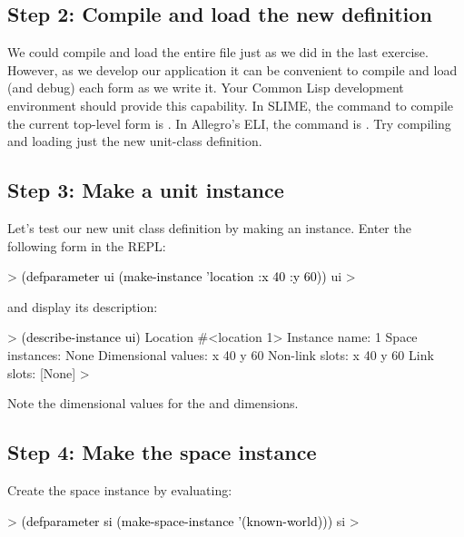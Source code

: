 \documentclass[10pt,twoside,english,pdftex]{article}
\begin{document}
\subsection*{Step 2: Compile and load the new definition}

We could compile and load the entire  file
just as we did in the last exercise.  However, as we develop our
application it can be convenient to compile and load (and debug) each
form as we write it.  Your Common Lisp development environment should
provide this capability.  In SLIME, the command to compile the current
top-level form is .  In Allegro's ELI, the command is
.  Try compiling and loading just the new
 unit-class definition.

\subsection*{Step 3: Make  a  unit instance}

%
%
Let's test our new  unit class definition by making an
instance.  Enter the following form in the REPL:
%
\begin{example}\color{darkergray}%
  > \textcolor{black}{(defparameter ui (make-instance 'location :x 40 :y 60))}
  ui
  >
\end{example}

%
and display its description:
%
\begin{example}\color{darkergray}%
  > \textcolor{black}{(describe-instance ui)}
  Location #<location 1>
    Instance name: 1
    Space instances: None
    Dimensional values:
      x 40
      y 60
    Non-link slots:
      x 40
      y 60
    Link slots:
      [None]
  >
\end{example}
%
Note the dimensional values for the  and  dimensions.

\subsection*{Step 4: Make  the  space instance}

%
Create the  space instance by evaluating:
%
\begin{example}\color{darkergray}%
  > \textcolor{black}{(defparameter si (make-space-instance '(known-world)))}
  si
  >
\end{example}
\end{document}

